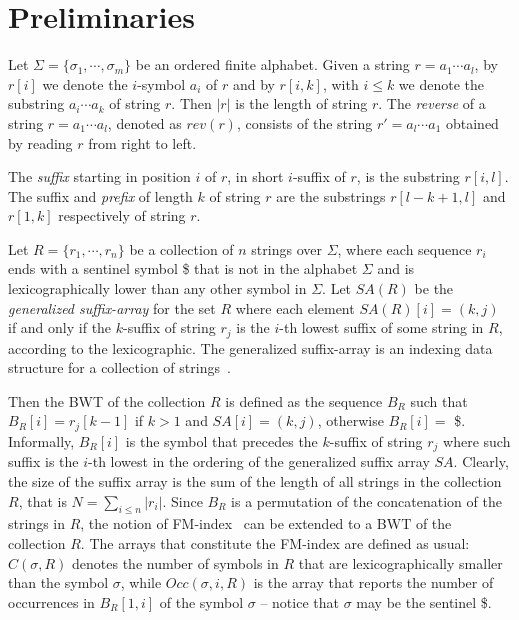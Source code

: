 \documentclass[runningheads,envcountsame,a4paper]{llncs}
\begin{document}
\section{Preliminaries}
Let $\Sigma = \{\sigma_1, \cdots, \sigma_m\}$ be an ordered finite
alphabet.
Given a string $r = a_1 \cdots a_l$, by $r[i]$ we denote the $i$-symbol
$a_i$ of $r$ and by $r[i,k]$, with $i \leq k$ we denote the substring
$a_i \cdots a_k$ of string $r$.
Then $|r|$ is the length of string $r$.
The \emph{reverse} of a string $r = a_1 \cdots a_l$, denoted as $rev(r)$,
consists of the string $r' = a_l \cdots a_1$ obtained by reading $r$
from right to left.

The \emph{suffix} starting in position $i$ of $r$, in short $i$-suffix of $r$, is
the substring $r[i, l]$.
The suffix and \emph{prefix} of length $k$ of string $r$ are the
substrings $r[l-k +1, l]$ and $r[1, k]$ respectively of string $r$.

Let $R = \{r_1, \cdots, r_n\}$ be a collection of $n$ strings over
$\Sigma$, where each sequence $r_i$ ends with a sentinel symbol \$
that is not in the alphabet $\Sigma$ and is lexicographically lower than
any other symbol in $\Sigma$.
Let $SA(R)$ be the \emph{generalized suffix-array} for the set $R$
where each element $SA(R)[i]= (k, j)$ if and only if the
$k$-suffix of string $r_{j}$ is the $i$-th lowest suffix of some string in $R$, according to the
lexicographic.
The generalized suffix-array is an indexing data structure for a
collection of strings~\cite{Shi1996}.

Then the BWT of the collection $R$ is defined as the sequence $B_R$ such
that $B_R[i]=r_{j}[k -1]$ if $k > 1$ and $SA[i] = (k,j)$, otherwise
$B_R[i]= $ \$.
Informally, $B_R[i]$ is the symbol that precedes the $k$-suffix of
string $r_j$ where such suffix is the $i$-th lowest in the ordering of
the generalized suffix array $SA$.
Clearly, the size of the suffix array is the sum of the length of all
strings in the collection $R$, that is $N =
\sum_{i \leq n}|r_i|$.
Since $B_R$ is a permutation of the concatenation of the strings in $R$,
the notion of FM-index~\cite{Ferragina2000} can be extended to a BWT of
the collection $R$.
The arrays that constitute the FM-index are defined as usual: $C(\sigma, R)$ denotes the
number of symbols in $R$ that are lexicographically smaller than the symbol
$\sigma$, while $Occ(\sigma, i, R)$ is the array that reports the number
of occurrences in $B_R[1, i]$ of the symbol $\sigma$ -- notice that $\sigma$ may be the sentinel \$.

\end{document}
